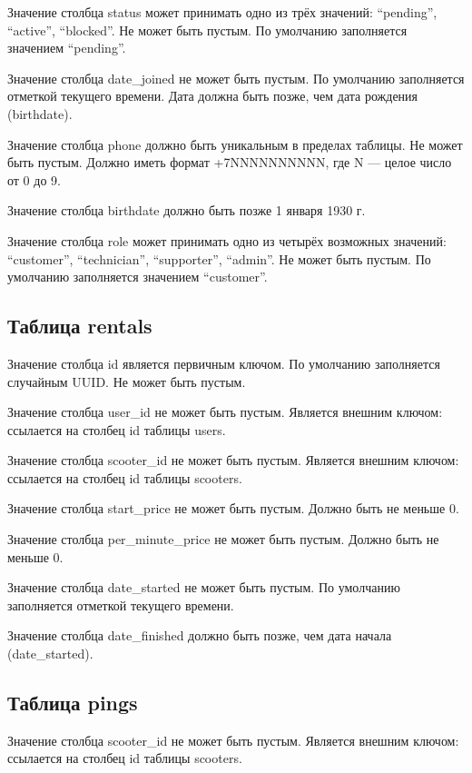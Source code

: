 Значение столбца status может принимать одно из трёх значений: \enquote{pending}, \enquote{active}, \enquote{blocked}. Не может быть пустым. По умолчанию заполняется значением \enquote{pending}.

Значение столбца date\_joined не может быть пустым. По умолчанию заполняется отметкой текущего времени. Дата должна быть позже, чем дата рождения (birthdate).

Значение столбца phone должно быть уникальным в пределах таблицы. Не может быть пустым. Должно иметь формат +7NNNNNNNNNN, где N --- целое число от 0 до 9.

Значение столбца birthdate должно быть позже 1 января 1930 г.

Значение столбца role может принимать одно из четырёх возможных значений: \enquote{customer}, \enquote{technician}, \enquote{supporter}, \enquote{admin}. Не может быть пустым. По умолчанию заполняется значением \enquote{customer}.

\subsection{Таблица rentals}

Значение столбца id является первичным ключом. По умолчанию заполняется случайным UUID. Не может быть пустым.

Значение столбца user\_id не может быть пустым. Является внешним ключом: ссылается на столбец id таблицы users.

Значение столбца scooter\_id не может быть пустым. Является внешним ключом: ссылается на столбец id таблицы scooters.

Значение столбца start\_price не может быть пустым. Должно быть не меньше 0.

Значение столбца per\_minute\_price не может быть пустым. Должно быть не меньше 0.

Значение столбца date\_started не может быть пустым. По умолчанию заполняется отметкой текущего времени.

Значение столбца date\_finished должно быть позже, чем дата начала (date\_started).

\subsection{Таблица pings}

Значение столбца scooter\_id не может быть пустым. Является внешним ключом: ссылается на столбец id таблицы scooters.

